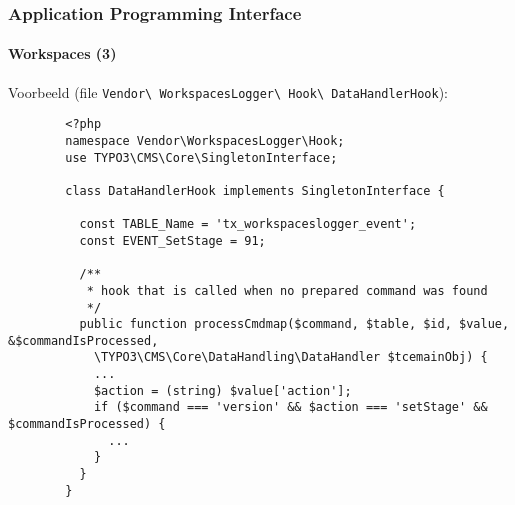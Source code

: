 
\begin{frame}[fragile]
	\frametitle{Application Programming Interface}
	\framesubtitle{Workspaces (3)}

	Voorbeeld (file \texttt{Vendor\textbackslash
		WorkspacesLogger\textbackslash
		Hook\textbackslash
		DataHandlerHook}):

	\lstset{
		basicstyle=\tiny\ttfamily
	}

	\begin{lstlisting}
		<?php
		namespace Vendor\WorkspacesLogger\Hook;
		use TYPO3\CMS\Core\SingletonInterface;

		class DataHandlerHook implements SingletonInterface {

		  const TABLE_Name = 'tx_workspaceslogger_event';
		  const EVENT_SetStage = 91;

		  /**
		   * hook that is called when no prepared command was found
		   */
		  public function processCmdmap($command, $table, $id, $value, &$commandIsProcessed,
		    \TYPO3\CMS\Core\DataHandling\DataHandler $tcemainObj) {
		    ...
		    $action = (string) $value['action'];
		    if ($command === 'version' && $action === 'setStage' && $commandIsProcessed) {
		      ...
		    }
		  }
		}
	\end{lstlisting}

\end{frame}


